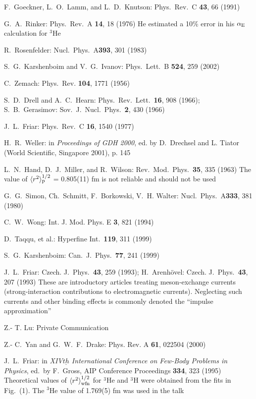 \documentclass{svmult}
\begin{document}
\begin{thebibliography}{999}
 F.\ Goeckner, L.\ O.\ Lamm, and L.\ D.\ Knutson:
Phys.\ Rev.\ C {\bf 43}, 66 (1991)

 G.\ A.\ Rinker: Phys.\ Rev.\ A {\bf 14}, 18 (1976) He estimated
a 10\% error in his $\alpha_{\rm E}$ calculation for $^3$He

 R.\ Rosenfelder: Nucl.\ Phys.\ A{\bf 393}, 301 (1983)

 S.\ G.\  Karshenboim and V.\ G.\ Ivanov: Phys.\ Lett.\ B{\bf 
524}, 259 (2002)

 C.\ Zemach: Phys.\ Rev. {\bf 104}, 1771 (1956)

 S.\ D.\ Drell and A.\ C.\ Hearn: Phys.\ Rev.\ Lett.\ {\bf 16},
908 (1966); S.\ B.\ Gerasimov: Sov.\ J.\ Nucl.\ Phys.\ {\bf 2}, 430 (1966)

 J.\ L.\ Friar: Phys.\ Rev.\ C {\bf 16}, 1540 (1977)

 H.\ R.\ Weller: in {\it Proceedings of GDH 2000},
ed. by D.\ Drechsel and L. Tiator (World Scientific, Singapore 2001), p. 145

 L.\ N.\ Hand, D.\ J.\ Miller, and R.\ Wilson: Rev.\ Mod.\ Phys.\
{\bf 35}, 335 (1963)  The value of $\langle r^2 \rangle_{\rm p}^{1/2}$ =
0.805(11) fm is not reliable and should not be used

 G.\ G.\ Simon, Ch.\ Schmitt, F.\ Borkowski, V.\ H. Walter:
Nucl.\ Phys.\ A{\bf 333}, 381 (1980)

 C.\ W.\ Wong: Int. J. Mod. Phys. E {\bf 3}, 821 (1994)

 D.\ Taqqu, et al.: Hyperfine Int.\ {\bf 119}, 311 (1999)

 S.\ G.\ Karshenboim: Can.\ J.\ Phys.\ {\bf 77}, 241 (1999)

 J.\ L.\ Friar: Czech. J.\ Phys.\ {\bf 43}, 259 (1993); H.\
Arenh\"ovel: Czech. J.\ Phys.\ {\bf 43}, 207 (1993) These are introductory 
articles treating meson-exchange currents (strong-interaction contributions to
electromagnetic currents). Neglecting such currents and other binding effects is
commonly denoted the ``impulse approximation''

 Z.- T. Lu: Private Communication

 Z.- C.\ Yan and G.\ W.\ F.\ Drake: Phys. Rev. A {\bf 61},
022504 (2000)

 J.\ L.\ Friar: in {\it XIV${\underline{th}}$ International
Conference on Few-Body Problems in Physics}, ed.\ by F.\ Gross, AIP Conference
Proceedings {\bf 334}, 323 (1995) Theoretical values of $\langle r^2
\rangle_{\rm wfn}^{1/2}$ for $^3$He and $^3$H were obtained from the fits in
Fig.~(1). The $^3$He value of 1.769(5) fm was 
used in the talk


\end{thebibliography}
\end{document}

